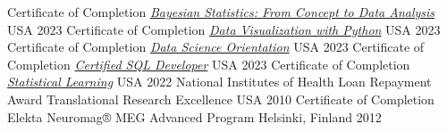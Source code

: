 


\begin{cvhonors}

  \cvhonor
    {Certificate of Completion} %
    {\href{https://www.coursera.org/account/accomplishments/certificate/DR5CTTN4HL35}{\emph{Bayesian Statistics: From Concept to Data Analysis}}} %
    {USA}
    {2023}
  \cvhonor
    {Certificate of Completion} %
    {\href{https://www.coursera.org/account/accomplishments/certificate/G4G3368QTG2N}{\emph{Data Visualization with Python}}} %
    {USA} %
    {2023} %
  \cvhonor
    {Certificate of Completion} %
    {\href{https://www.coursera.org/account/accomplishments/certificate/HM6YZKUP8J8X}{\emph{Data Science Orientation}}} %
    {USA} %
    {2023} %
  \cvhonor
    {Certificate of Completion} %
    {\href{https://verify.w3schools.com/1NDRG69DTP}{\emph{Certified SQL Developer}}} %
    {USA} %
    {2023} %
  \cvhonor
    {Certificate of Completion} %
    {\href{https://courses.edx.org/certificates/6def26e9529b4ded83ebfe2e86e7e0da}{\emph{Statistical Learning}}} %
    {USA} %
    {2022} %
  \cvhonor
    {National Institutes of Health Loan Repayment Award} %
    {Translational Research Excellence} %
    {USA} %
    {2010} %
  \cvhonor
    {Certificate of Completion} %
    {Elekta Neuromag® MEG Advanced Program} %
    {Helsinki, Finland} %
    {2012} %
\end{cvhonors}
